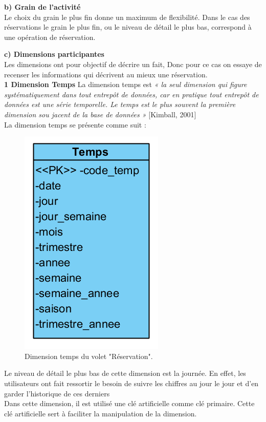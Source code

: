 \textbf{b)	Grain de l’activité}\\
Le choix du grain le plus fin donne un maximum de flexibilité. Dans le cas des réservations le grain le plus fin, ou le niveau de détail le plus bas, correspond à une opération de réservation.

\textbf{c)	Dimensions participantes}\\
Les dimensions ont pour objectif de décrire un fait, Donc pour ce cas on essaye de recenser les informations qui décrivent au mieux une réservation.\\

\textbf{1 Dimension Temps}
La dimension temps est \textit{« la seul dimension qui figure systématiquement dans tout entrepôt de données, car en pratique tout entrepôt de données est une série temporelle. Le temps est le plus souvent la première dimension sou jacent de la base de données »} [Kimball, 2001]\\

La dimension temps se présente comme suit :

\begin{figure}[!htbp]
	\begin{center}
		\includegraphics[scale=0.65]{images/dim_temps.png}
		\caption{Dimension temps du volet "Réservation".}
		\label{use_bi_tools}
	\end{center}
	\end{figure}

Le niveau de détail le plus bas de cette dimension est la journée. En effet, les utilisateurs ont fait ressortir le besoin de suivre les chiffres au jour le jour et d’en garder l'historique de ces derniers\\
Dans cette dimension, il est utilisé une clé artificielle comme clé primaire. Cette clé artificielle sert à faciliter la manipulation de la dimension.\\

